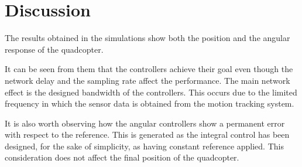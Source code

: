 \section{Discussion}
The results obtained in the simulations show both the position and the angular response of the quadcopter. 

It can be seen from them that the controllers achieve their goal even though the network delay and the sampling rate affect the performance. The main network effect is the designed bandwidth of the controllers. This occurs due to the limited frequency in which the sensor data is obtained from the motion tracking system. 

It is also worth observing how the angular controllers show a permanent error with respect to the reference. This is generated as the integral control has been designed, for the sake of simplicity, as having constant reference applied. This consideration does not affect the final position of the quadcopter.